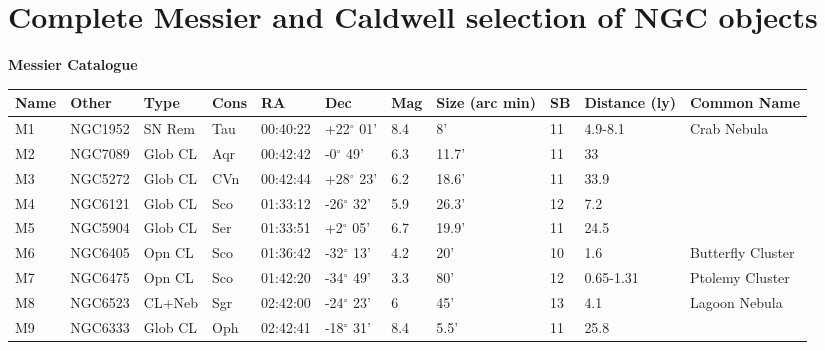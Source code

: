 \documentclass[10pt,twoside,a4paper,english]{article}
\begin{document}
\section{Complete Messier and Caldwell selection of NGC objects} 
\vspace{4 mm} 
\hspace{4 mm} 
{\bf Messier Catalogue} 
\begin{longtable}{@{}lllllllllll@{}} 
\hline 
{\bf Name} & {\bf Other} & {\bf Type} & {\bf Cons} & {\bf RA}  & {\bf Dec} & {\bf Mag} & {\bf Size (arc min)} & {\bf SB} & {\bf Distance (ly)} & {\bf Common Name}               \\ 
\hline 
M1         & NGC1952     & SN Rem     & Tau       & 00:40:22 & +22$^{\circ}$ 01'  & 8.4       & 8'                   & 11       & 4.9-8.1             & Crab Nebula                               \\ 
M2         & NGC7089     & Glob CL    & Aqr       & 00:42:42 & -0$^{\circ}$ 49'   & 6.3       & 11.7'                & 11       & 33                  &                                           \\ 
M3         & NGC5272     & Glob CL    & CVn       & 00:42:44 & +28$^{\circ}$ 23'  & 6.2       & 18.6'                & 11       & 33.9                &                                           \\ 
M4         & NGC6121     & Glob CL    & Sco       & 01:33:12 & -26$^{\circ}$ 32'  & 5.9       & 26.3'                & 12       & 7.2                 &                                           \\ 
M5         & NGC5904     & Glob CL    & Ser       & 01:33:51 & +2$^{\circ}$ 05'   & 6.7       & 19.9'                & 11       & 24.5                &                                           \\ 
M6         & NGC6405     & Opn CL     & Sco       & 01:36:42 & -32$^{\circ}$ 13'  & 4.2       & 20'                  & 10       & 1.6                 & Butterfly Cluster                         \\ 
M7         & NGC6475     & Opn CL     & Sco       & 01:42:20 & -34$^{\circ}$ 49'  & 3.3       & 80'                  & 12       & 0.65-1.31           & Ptolemy Cluster                           \\ 
M8         & NGC6523     & CL+Neb     & Sgr       & 02:42:00 & -24$^{\circ}$ 23'  & 6         & 45'                  & 13       & 4.1                 & Lagoon Nebula                             \\ 
M9         & NGC6333     & Glob CL    & Oph       & 02:42:41 & -18$^{\circ}$ 31'  & 8.4       & 5.5'                 & 11       & 25.8                &                                           \\ 

\end{longtable}
\end{document}
